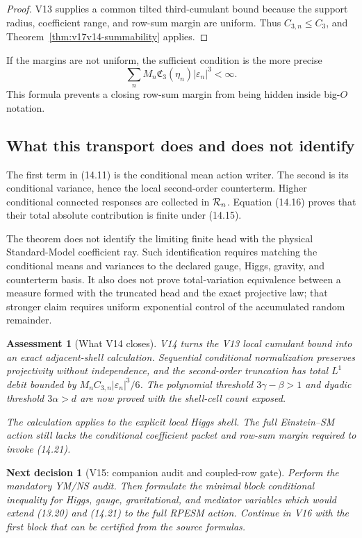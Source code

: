 \documentclass[11pt]{article}
\newtheorem{decision}[theorem]{Next decision}
\newtheorem{assessment}[theorem]{Assessment}
\theoremstyle{remark}
\begin{document}
\begin{proof}
V13 supplies a common tilted third-cumulant bound because the
support radius, coefficient range, and row-sum margin are uniform.
Thus \(C_{3,n}\leq C_3\), and
Theorem~\ref{thm:v17v14-summability} applies.
\end{proof}

If the margins are not uniform, the sufficient condition is the
more precise
\[
 \sum_n
 M_n{\mathfrak C}_3(\eta_n)|\varepsilon_n|^3<\infty.               \tag{14.21}
\]
This formula prevents a closing row-sum margin from being hidden
inside big-\(O\) notation.

\subsection{What this transport does and does not identify}

The first term in (14.11) is the conditional mean action writer.
The second is its conditional variance, hence the local
second-order counterterm.  Higher conditional connected responses
are collected in \({\cal R}_n\).  Equation (14.16) proves that their
total absolute contribution is finite under (14.15).

The theorem does not identify the limiting finite head with the
physical Standard-Model coefficient ray.  Such identification
requires matching the conditional means and variances to the
declared gauge, Higgs, gravity, and counterterm basis.  It also does
not prove total-variation equivalence between a measure formed with
the truncated head and the exact projective law; that stronger
claim requires uniform exponential control of the accumulated
random remainder.

\begin{assessment}[What V14 closes]
\label{ass:v17v14-status}
V14 turns the V13 local cumulant bound into an exact adjacent-shell
calculation.  Sequential conditional normalization preserves
projectivity without independence, and the second-order truncation
has total \(L^1\) debit bounded by
\(M_nC_{3,n}|\varepsilon_n|^3/6\).  The polynomial threshold
\(3\gamma-\beta>1\) and dyadic threshold \(3\alpha>d\) are now
proved with the shell-cell count exposed.

The calculation applies to the explicit local Higgs shell.  The
full Einstein--SM action still lacks the conditional coefficient
packet and row-sum margin required to invoke (14.21).
\end{assessment}

\begin{decision}[V15: companion audit and coupled-row gate]
\label{dec:v17v14-next}
Perform the mandatory YM/NS audit.  Then formulate the minimal
block conditional inequality for Higgs, gauge, gravitational, and
mediator variables which would extend (13.20) and (14.21) to the
full RPESM action.  Continue in V16 with the first block that can be
certified from the source formulas.
\end{decision}
\end{document}
